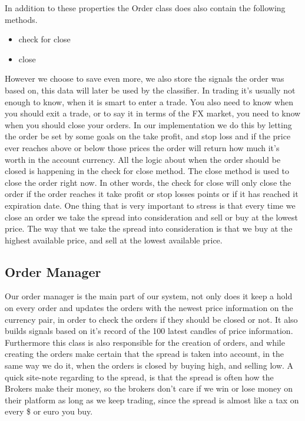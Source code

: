 In addition to these properties the Order class does also contain the following methods.
\begin{itemize}
\item{check for close}
\item{close}
\end{itemize}

However we choose to save even more, we also store the signals the order was based on, this data will later be used by the classifier. 
In trading it's usually not enough to know, when it is smart to enter a trade. You also need to know when you should exit a trade, or to say it in terms of the FX market, you need to know when you should close your orders. In our implementation we do this by letting the order be set by some goals on the take profit, and stop loss and if the price ever reaches above or below those prices the order will return how much it's worth in the account currency. All the logic about when the order should be closed is happening in the check for close method. The close method is used to close the order right now. In other words, the check for close will only close the order if the order reaches it take profit or stop losses points or if it has reached it expiration date.
One thing that is very important to stress is that every time we close an order we take the spread into consideration and sell or buy at the lowest price. The way that we take the spread into consideration is that we buy at the highest available price, and sell at the lowest available price.

\subsection{Order Manager}
Our order manager is the main part of our system, not only does it keep a hold on every order and updates the orders with the newest price information on the currency pair, in order to check the orders if they should be closed or not. It also builds signals based on it's record of the 100 latest candles of price information. Furthermore this class is also responsible for the creation of orders, and while creating the orders make certain that the spread is taken into account, in the same way we do it, when the orders is closed by buying high, and selling low. A quick site-note regarding to the spread, is that the spread is often how the Brokers make their money, so the brokers don't care if we win or lose money on their platform as long as we keep trading, since the spread is almost like a tax on every \$ or euro you buy.


